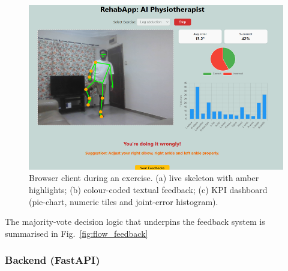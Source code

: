 \documentclass{article}
\begin{document}
\begin{figure}[H]
  \centering
  \includegraphics[width=\linewidth]{figs/frontend_dashboard.png}
  \caption{Browser client during an exercise.  
           (a) live skeleton with amber highlights;  
           (b) colour-coded textual feedback;  
           (c) KPI dashboard (pie-chart, numeric tiles and
           joint-error histogram).}
  \label{fig:frontend_ui}
\end{figure}

The majority-vote decision logic that underpins the feedback system is
summarised in Fig.~\ref{fig:flow_feedback}

\subsubsection{Backend (FastAPI)}
\label{ssec:backend}
\end{document}
